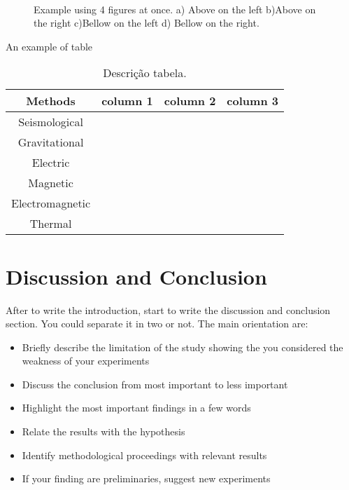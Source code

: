 \documentclass[twoside,letterpaper,twocolumn]{article}
\begin{document}
\begin{figure}[h!]
	\centering
	\\
	\caption{ Example using 4 figures at once. a) Above on the left b)Above on the right  c)Bellow on the left d) Bellow on the right.}
	\label{fig:label9}
\end{figure}


An example of table

\begin{table}[htb]
	\caption{Descrição tabela.}
	\label{tab:label1}
	\begin{tabular}{|c|c|c|c|}
		\hline 
		\textbf{Methods} & \textbf{column 1} & \textbf{column 2} & \textbf{column 3} \\ 
		\hline 
		Seismological    &  &  &  \\ 
		\hline 
		Gravitational    &  &  &  \\ 
		\hline 
		Electric         &  &  &  \\ 
		\hline 
		Magnetic         &  &  &  \\ 
		\hline 
		Electromagnetic  &  &  &  \\ 
		\hline 
		Thermal          &  &  &  \\ 
		\hline 
	\end{tabular} 
\end{table}


\section*{Discussion and Conclusion}

After to write the introduction, start to write the discussion and conclusion section. You could separate it in two or not. The main orientation are:

\begin{itemize}
	\item Briefly describe the limitation of the study showing the you considered the weakness of your experiments
	\item Discuss the conclusion from most important to less important
	\item Highlight the most important findings in a few words
	\item Relate the results with the hypothesis
	\item  Identify methodological proceedings with relevant results
	\item If your finding are preliminaries, suggest new experiments
	
\end{itemize}
\end{document}

